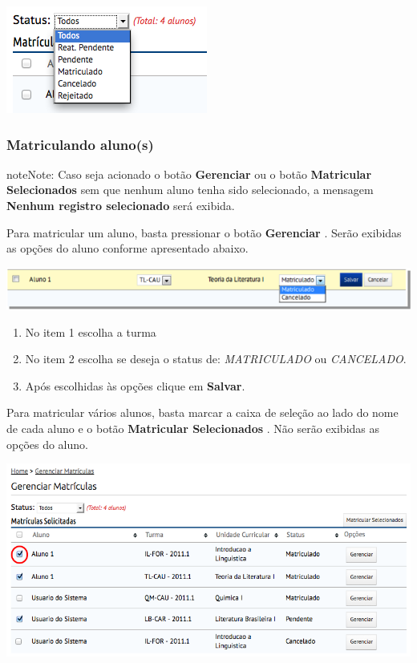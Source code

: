 \documentclass[letterpaper,10pt,english]{sphinxmanual}
\begin{document}
{\hfill\includegraphics{enrollment-manage-03.png}\hfill}


\subsubsection{Matriculando aluno(s)}
\label{enrollment:matriculando-aluno-s}
\begin{notice}{note}{Note:}
Caso seja acionado o botão \textbf{Gerenciar} ou o botão \textbf{Matricular Selecionados} sem que nenhum aluno tenha sido selecionado, a mensagem \textbf{Nenhum registro selecionado} será exibida.
\end{notice}

Para matricular um aluno, basta pressionar o botão \textbf{Gerenciar} . Serão exibidas as opções do aluno conforme apresentado abaixo.

{\hfill\includegraphics{enrollment-manage-04.png}\hfill}
\begin{enumerate}
\item {} 
No item 1 escolha a turma

\item {} 
No item 2 escolha se deseja o status de: \emph{MATRICULADO} ou \emph{CANCELADO}.

\item {} 
Após escolhidas às opções clique em \textbf{Salvar}.

\end{enumerate}

Para matricular vários alunos, basta marcar a caixa de seleção ao lado do nome de cada aluno e o botão \textbf{Matricular Selecionados} . Não serão exibidas as opções do aluno.

{\hfill\includegraphics{enrollment-manage-05.png}\hfill}
\end{document}
